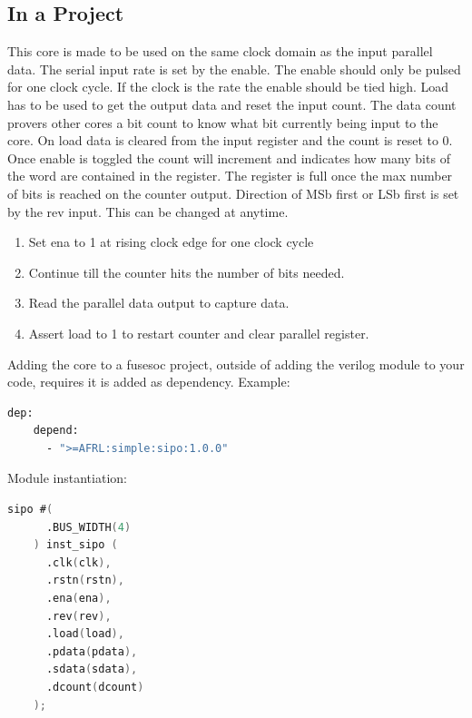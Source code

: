 

\subsection{In a Project}
\par
This core is made to be used on the same clock domain as the input parallel data. The serial input rate is set by the enable.
The enable should only be pulsed for one clock cycle. If the clock is the rate the enable should be tied high. Load has to be
used to get the output data and reset the input count. The data count provers other cores a bit count to know what bit currently being
input to the core. On load data is cleared from the input register and the count is reset to 0. Once enable is toggled the count
will increment and indicates how many bits of the word are contained in the register. The register is full once the max number
of bits is reached on the counter output. Direction of MSb first or LSb first is set by the rev input. This can be changed at anytime.
\begin{enumerate}
  \item Set ena to 1 at rising clock edge for one clock cycle
  \item Continue till the counter hits the number of bits needed.
  \item Read the parallel data output to capture data.
  \item Assert load to 1 to restart counter and clear parallel register.
\end{enumerate}

Adding the core to a fusesoc project, outside of adding the verilog module to your code, requires it is added as dependency.
Example:
\begin{lstlisting}[language=bash]
  dep:
    depend:
      - ">=AFRL:simple:sipo:1.0.0"
\end{lstlisting}

Module instantiation:
\begin{lstlisting}[language=Verilog]
    sipo #(
      .BUS_WIDTH(4)
    ) inst_sipo (
      .clk(clk),
      .rstn(rstn),
      .ena(ena),
      .rev(rev),
      .load(load),
      .pdata(pdata),
      .sdata(sdata),
      .dcount(dcount)
    );
\end{lstlisting}

